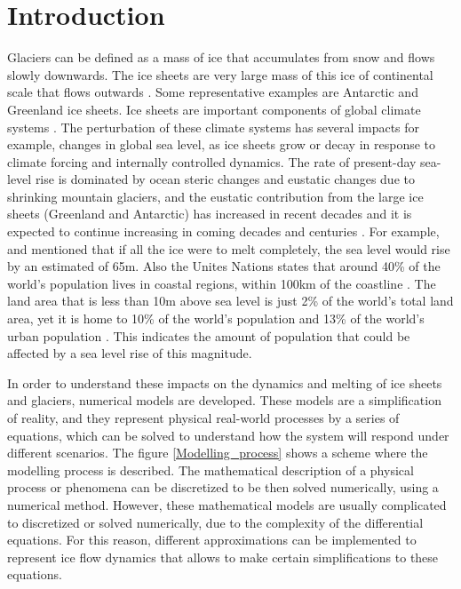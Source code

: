 \documentclass{article}
\begin{document}


\tableofcontents

\pagebreak

\section{Introduction}
\justifying
Glaciers can be defined as a mass of ice that accumulates from snow and flows slowly downwards. The ice sheets are very large mass of this ice of continental scale that flows outwards \cite{anesio2012glaciers}. Some representative examples are Antarctic and Greenland ice sheets. Ice sheets are important components of global climate systems \cite{zhang2017comparison}. The perturbation of these climate systems has several impacts for example, changes in global sea level, as ice sheets grow or decay in response to climate forcing and internally controlled dynamics. The rate of present-day sea-level rise is dominated by ocean steric changes and eustatic changes due to shrinking mountain glaciers, and the eustatic contribution from the large ice sheets (Greenland and Antarctic) has increased in recent decades and it is expected to continue increasing in coming decades and centuries \cite{clark2015recent}. For example, \cite{morlighem2017bedmachine} and \cite{haywood2011pliocene} mentioned that if all the ice were to melt completely, the sea level would rise by an estimated of 65m. Also the Unites Nations states that around 40\% of the world's population lives in coastal regions, within 100km of the coastline \cite{barbier2015climate, montgomery2007united}. The land area that is less than 10m above sea level is just 2\% of the world's total land area, yet it is home to 10\% of the world's population and 13\% of the world's urban population \cite{nevermann2023land}. This indicates the amount of population that could be affected by a sea level rise of this magnitude. 

In order to understand these impacts on the dynamics and melting of ice sheets and glaciers, numerical models are developed. These models are a simplification of reality, and they represent physical real-world processes by a series of equations, which can be solved to understand how the system will respond under different scenarios. The figure \ref{Modelling_process} shows a scheme where the modelling process is described. The mathematical description of a physical process or phenomena can be discretized to be then solved numerically, using a numerical method. However, these mathematical models are usually complicated to discretized or solved numerically, due to the complexity of the differential equations. For this reason, different approximations can be implemented to represent ice flow dynamics that allows to make certain simplifications to these equations. 
\end{document}
